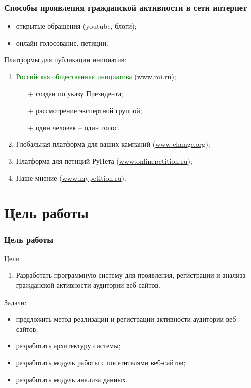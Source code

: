 \documentclass{beamer}
\begin{document}
\begin{frame}
\frametitle{Способы проявления гражданской активности в сети интернет}
\begin{itemize}
  \item открытые обращения (youtube, блоги); \vspace{0.5cm}
  \item онлайн-голосование, петиции.
\end{itemize}

Платформы для публикации инициатив:
\begin{enumerate}
  \item 
  \textcolor{green}{\large Российская общественная инициатива} (\url{www.roi.ru});
    \begin{itemize}
    \item[$+$] создан по указу Президента;
    \item[$+$] рассмотрение экспертной группой;
    \item[$+$] один человек -- один голос.
    \end{itemize}
  \item Глобальная платформа для ваших кампаний (\url{www.change.org});
  \item Платформа для петиций РуНета (\url{www.onlinepetition.ru});
  \item Наше мнение (\url{www.mypetition.ru}).
\end{enumerate}
\end{frame}

\section{Цель работы}
\begin{frame}
\frametitle{Цель работы}
\begin{block}{Цели}
\begin{enumerate}
  \item Разработать программную систему для проявления, регистрации и анализа гражданской активности аудитории веб-сайтов.
\end{enumerate}
\end{block}
Задачи:
\begin{itemize}
  \item предложить метод реализации и регистрации активности аудитории веб-сайтов;
  \item разработать архитектуру системы;
  \item разработать модуль работы с посетителями веб-сайтов;
  \item разработать модуль анализа данных.
\end{itemize}
\end{frame}
\end{document}
